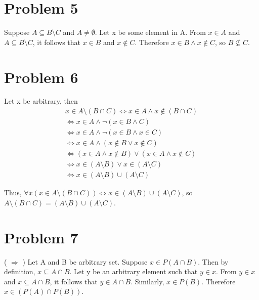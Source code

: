 \documentclass{article}
\begin{document}
\section{Problem 5}

Suppose $A \subseteq B \setminus C$ and $A \neq \emptyset$. Let x be
some element in A. From $x \in A$ and $A \subseteq B \setminus C$, it
follows that $x \in B$ and $x \notin C$. Therefore $x \in B \land x
\notin C$, so $B \nsubseteq C$.

\section{Problem 6}

Let x be arbitrary, then
\begin{align*}
  x \in A \setminus (B \cap C) \iff x \in A \land x \notin (B \cap C) \\
                               \iff x \in A \land \neg (x \in B \land
                               C) \\
                               \iff x \in A \land \neg(x \in B \land x
                               \in C) \\
                               \iff x \in A \land (x \notin B \lor x
                               \notin C) \\
                               \iff (x \in A \land x \notin B) \lor (x
                               \in A \land x \notin C) \\
                               \iff x \in (A \setminus B) \lor x \in
                               (A \setminus C) \\
                               \iff x \in (A \setminus B) \cup (A
                               \setminus C)
\end{align*}

Thus, $\forall x (x \in A \setminus (B \cap C)) \iff x \in (A
\setminus B) \cup (A \setminus C)$, so $A \setminus (B \cap C) = (A
\setminus B) \cup (A \setminus C)$.

\section{Problem 7}

( $\Rightarrow$ ) Let A and B be arbitrary set. Suppose $x \in P(A
\cap B)$. Then by definition,  $x \subseteq A \cap B$. Let y be an
arbitrary element such that $y \in x$. From $y \in x$ and $x \subseteq
A \cap B$, it follows that $y \in A \cap B$. Similarly, $x \in P(B)$.
Therefore $x \in (P(A) \cap P(B))$.
\end{document}
